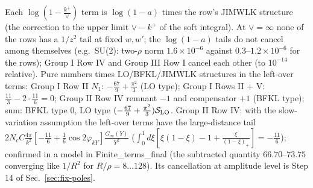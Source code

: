 \documentclass[10pt]{article}
\begin{document}
\noindent Each $\log(1-\frac{k^{+}}{\vee})$ term is $\log(1-a)$ times the row's JIMWLK structure (the correction to the upper limit $\vee-k^{+}$ of the soft integral). At $\vee=\infty$ none of the rows has a $1/z^{2}$ tail at fixed $w,w'$; the $\log(1-a)$ tails do not cancel among themselves (e.g.\ SU(2): two-$\rho$ norm $1.6\times10^{-6}$ against $0.3$--$1.2\times10^{-6}$ for the rows); Group I Row IV and Group III Row I cancel each other (to $10^{-14}$ relative). Pure numbers times LO/BFKL/JIMWLK structures in the left-over terms: Group I Row II $N_{1}$: $-\frac{67}{9}+\frac{\pi^{2}}{3}$ (LO type); Group I Rows II + V: $\frac{11}{3}-2\cdot\frac{11}{6}=0$; Group II Row IV remnant $-1$ and compensator $+1$ (BFKL type); sum: BFKL type $0$, LO type $(-\frac{67}{9}+\frac{\pi^{2}}{3})\mathcal{S}_{\rm LO}$. Group II Row IV: with the slow-variation assumption the left-over terms have the large-distance tail $2N_{c}C\frac{4\pi}{k^{2}}[-\frac{11}{6}+\frac16\cos2\varphi_{kY}]\frac{G_{\infty}(Y)}{Y^{2}}$ ($\int_{0}^{1}d\xi[\xi(1-\xi)-1+\frac{\xi}{(1-\xi)_{+}}]=-\frac{11}{6}$); confirmed in a model in Finite\_terms\_final (the subtracted quantity $66.70$--$73.75$ converging like $1/R^{2}$ for $R/\rho=8\dots128$). Its cancellation at amplitude level is Step 14 of Sec.~\ref{sec:fix-poles}.
\end{document}

